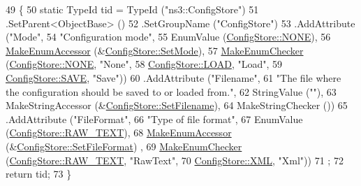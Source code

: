 \begin{DoxyCode}
49 \{
50   \textcolor{keyword}{static} TypeId tid = TypeId (\textcolor{stringliteral}{"ns3::ConfigStore"})
51     .SetParent<ObjectBase> ()
52     .SetGroupName (\textcolor{stringliteral}{"ConfigStore"})
53     .AddAttribute (\textcolor{stringliteral}{"Mode"}, 
54                    \textcolor{stringliteral}{"Configuration mode"},
55                    EnumValue (\hyperlink{classns3_1_1ConfigStore_a3d4a0f3b64adcf3d5468419dca8c1b07a5df85830f731a6a051ca5b0f93fd4fb0}{ConfigStore::NONE}),
56                    \hyperlink{namespacens3_af5050739867ce63896dec011e332c8ec}{MakeEnumAccessor} (&\hyperlink{classns3_1_1ConfigStore_afad2b8123ceb85e50141b65a91f3e5a0}{ConfigStore::SetMode}),
57                    \hyperlink{namespacens3_a48832781a2b521d3d0091e05ece30615}{MakeEnumChecker} (\hyperlink{classns3_1_1ConfigStore_a3d4a0f3b64adcf3d5468419dca8c1b07a5df85830f731a6a051ca5b0f93fd4fb0}{ConfigStore::NONE}, \textcolor{stringliteral}{"None"},
58                                     \hyperlink{classns3_1_1ConfigStore_a3d4a0f3b64adcf3d5468419dca8c1b07acbf52831ceacb59f36f502c8f993f7eb}{ConfigStore::LOAD}, \textcolor{stringliteral}{"Load"},
59                                     \hyperlink{classns3_1_1ConfigStore_a3d4a0f3b64adcf3d5468419dca8c1b07ad890041eb8798761a606ab2b06f76cc0}{ConfigStore::SAVE}, \textcolor{stringliteral}{"Save"}))
60     .AddAttribute (\textcolor{stringliteral}{"Filename"}, 
61                    \textcolor{stringliteral}{"The file where the configuration should be saved to or loaded from."},
62                    StringValue (\textcolor{stringliteral}{""}),
63                    MakeStringAccessor (&\hyperlink{classns3_1_1ConfigStore_a1bbe4c144c744c68b8165657fed988eb}{ConfigStore::SetFilename}),
64                    MakeStringChecker ())
65     .AddAttribute (\textcolor{stringliteral}{"FileFormat"},
66                    \textcolor{stringliteral}{"Type of file format"},
67                    EnumValue (\hyperlink{classns3_1_1ConfigStore_ac60fd234eb07b100f16833c166f8f507a431827066198120ce78007cfa6595a1d}{ConfigStore::RAW\_TEXT}),
68                    \hyperlink{namespacens3_af5050739867ce63896dec011e332c8ec}{MakeEnumAccessor} (&\hyperlink{classns3_1_1ConfigStore_aa0d3139e3ef9470bc0ac610aa4dc702d}{ConfigStore::SetFileFormat})
      ,
69                    \hyperlink{namespacens3_a48832781a2b521d3d0091e05ece30615}{MakeEnumChecker} (\hyperlink{classns3_1_1ConfigStore_ac60fd234eb07b100f16833c166f8f507a431827066198120ce78007cfa6595a1d}{ConfigStore::RAW\_TEXT}, \textcolor{stringliteral}{"RawText"},
70                                     \hyperlink{classns3_1_1ConfigStore_ac60fd234eb07b100f16833c166f8f507a52e8fefce8b5da7c59c1f89001b77b82}{ConfigStore::XML}, \textcolor{stringliteral}{"Xml"}))
71   ;
72   \textcolor{keywordflow}{return} tid;
73 \}
\end{DoxyCode}


